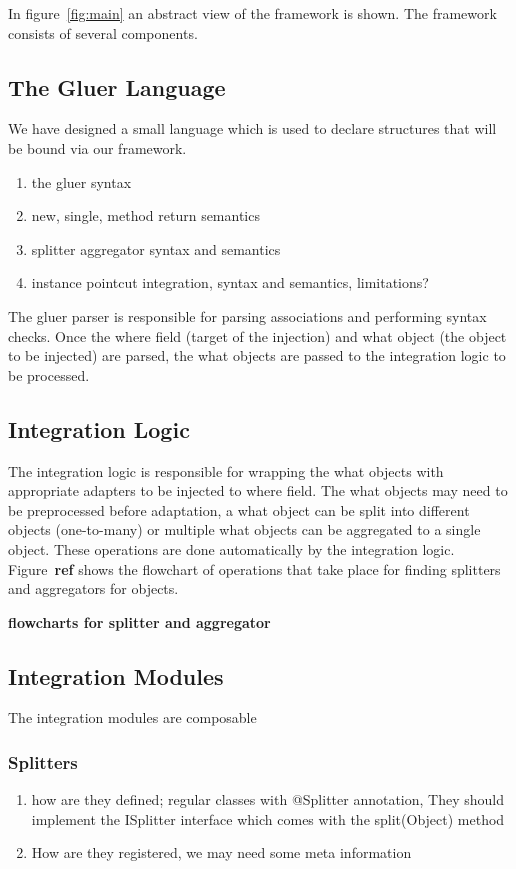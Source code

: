 \documentclass{llncs}
\begin{document}
In figure~\ref{fig:main} an abstract view of the framework is shown. The framework consists of several components. 

\subsection{The Gluer Language}
We have designed a small language which is used to declare structures that will be bound via our framework. 

\begin{enumerate}
\item the gluer syntax
\item new, single, method return semantics
\item splitter aggregator syntax and semantics
\item instance pointcut integration, syntax and semantics, limitations?
\end{enumerate}

The \textsf{gluer parser} is responsible for parsing associations and performing syntax checks. Once the where field (target of the injection) and what object (the object to be injected) are parsed, the what objects are passed to the integration logic to be processed.

\subsection{Integration Logic}
The integration logic is responsible for wrapping the what objects with appropriate adapters to be injected to where field. 
The what objects may need to be preprocessed before adaptation, a what object can be split into different objects (one-to-many) or multiple what objects can be aggregated to a single object. 
These operations are done automatically by the integration logic. Figure~\textbf{ref} shows the flowchart of operations that take place for finding splitters and aggregators for objects.

\textbf{flowcharts for splitter and aggregator}

\subsection{Integration Modules}

The integration modules are composable 

\subsubsection{Splitters}
\begin{enumerate}
\item how are they defined; regular classes with @Splitter annotation, They should implement the ISplitter interface which comes with the split(Object) method
\item How are they registered, we may need some meta information
\end{enumerate}
\end{document}
